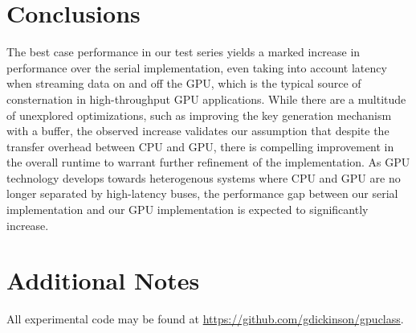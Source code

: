 \documentclass[twocolumn]{article}
\begin{document}
  \section{Conclusions}
   The best case performance in our test series yields a marked increase in performance over the serial implementation, even taking into account latency when streaming data on and off the GPU, which is the typical source of consternation in high-throughput GPU applications.  While there are a multitude of unexplored optimizations, such as improving the key generation mechanism with a buffer, the observed increase validates our assumption that despite the transfer overhead between CPU and GPU, there is compelling improvement in the overall runtime to warrant further refinement of the implementation.  As GPU technology develops towards heterogenous systems where CPU and GPU are no longer separated by high-latency buses, the performance gap between our serial implementation and our GPU implementation is expected to significantly increase.

  \section{Additional Notes}
  All experimental code may be found at \url{https://github.com/gdickinson/gpuclass}.
  
  {}
  
  
\end{document}
